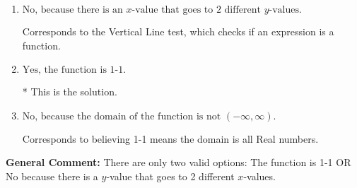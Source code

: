 \documentclass{extbook}[14pt]
\begin{document}
\begin{enumerate}
{\begin{enumerate}[label=\Alph*.]
Corresponds to the Horizontal Line test, which this function passes.
\item \( \text{No, because there is an $x$-value that goes to 2 different $y$-values.} \)

Corresponds to the Vertical Line test, which checks if an expression is a function.
\item \( \text{Yes, the function is 1-1.} \)

* This is the solution.
\item \( \text{No, because the domain of the function is not $(-\infty, \infty)$.} \)

Corresponds to believing 1-1 means the domain is all Real numbers.
\end{enumerate}

\textbf{General Comment:} There are only two valid options: The function is 1-1 OR No because there is a $y$-value that goes to 2 different $x$-values.
}
\end{enumerate}
\end{document}
